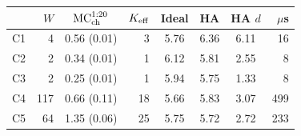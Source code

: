 \begin{tabular}{@{}lrcrcccr@{}}
\toprule
 & $W$ & $\mathrm{MC}_{\rm ch}^{1:20}$ & $K_{\rm eff}$ & Ideal & HA & HA $d$ & $\mu$s \\
\midrule
C1 & 4 & 0.56 (0.01) & 3 & 5.76 & 6.36 & 6.11 & 16 \\
C2 & 2 & 0.34 (0.01) & 1 & 6.12 & 5.81 & 2.55 & 8 \\
C3 & 2 & 0.25 (0.01) & 1 & 5.94 & 5.75 & 1.33 & 8 \\
C4 & 117 & 0.66 (0.11) & 18 & 5.66 & 5.83 & 3.07 & 499 \\
C5 & 64 & 1.35 (0.06) & 25 & 5.75 & 5.72 & 2.72 & 233 \\
\bottomrule
\end{tabular}
